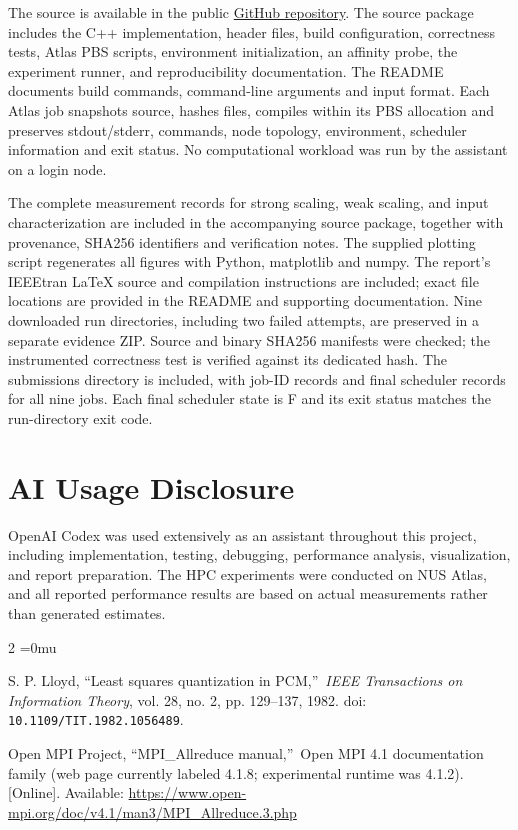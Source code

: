 \documentclass[conference,a4paper,10pt]{IEEEtran}
\begin{document}
\begingroup
\RaggedRight
\setlength{\parindent}{1em}
The source is available in the public \href{https://github.com/carus7749/parallel-kmeans-mpi-openmp}{GitHub repository}. The source package includes the C++ implementation, header files, build configuration, correctness tests, Atlas PBS scripts, environment initialization, an affinity probe, the experiment runner, and reproducibility documentation. The README documents build commands, command-line arguments and input format. Each Atlas job snapshots source, hashes files, compiles within its PBS allocation and preserves stdout/stderr, commands, node topology, environment, scheduler information and exit status. No computational workload was run by the assistant on a login node.

The complete measurement records for strong scaling, weak scaling, and input characterization are included in the accompanying source package, together with provenance, SHA256 identifiers and verification notes. The supplied plotting script regenerates all figures with Python, matplotlib and numpy. The report's IEEEtran LaTeX source and compilation instructions are included; exact file locations are provided in the README and supporting documentation. Nine downloaded run directories, including two failed attempts, are preserved in a separate evidence ZIP. Source and binary SHA256 manifests were checked; the instrumented correctness test is verified against its dedicated hash. The submissions directory is included, with job-ID records and final scheduler records for all nine jobs. Each final scheduler state is F and its exit status matches the run-directory exit code.
\par
\endgroup

\section*{AI Usage Disclosure}

OpenAI Codex was used extensively as an assistant throughout this project, including implementation, testing, debugging, performance analysis, visualization, and report preparation. The HPC experiments were conducted on NUS Atlas, and all reported performance results are based on actual measurements rather than generated estimates.

\begin{thebibliography}{2}
\RaggedRight
\Urlmuskip=0mu

 S. P. Lloyd, ``Least squares quantization in PCM,\textquotedblright\ \emph{IEEE Transactions on Information Theory}, vol. 28, no. 2, pp. 129--137, 1982. doi: \nolinkurl{10.1109/TIT.1982.1056489}.

 Open MPI Project, ``MPI\_Allreduce manual,\textquotedblright\ Open MPI 4.1 documentation family (web page currently labeled 4.1.8; experimental runtime was 4.1.2). [Online]. Available: \url{https://www.open-mpi.org/doc/v4.1/man3/MPI_Allreduce.3.php}

\end{thebibliography}
\end{document}
